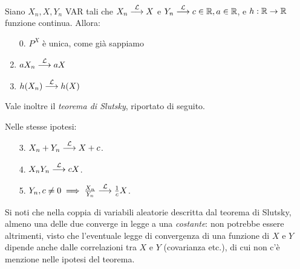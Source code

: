 \begin{prop}
  Siano $X_n, X, Y_n$ VAR tali che $X_n \stackrel{\mathcal L}{\longrightarrow} X$ e $Y_n \stackrel{\mathcal L}{\longrightarrow} c \in \mathbb R, a \in \mathbb R$, e $h:\mathbb R \to \mathbb R$ funzione continua.
  Allora:
  \begin{enumerate}
    \item[0.] $P^X$ è unica, come già sappiamo
    \item $a X_n \stackrel{\mathcal L}{\longrightarrow} aX$
    \item $h(X_n) \stackrel{\mathcal L}{\longrightarrow} h(X)$
  \end{enumerate}
  Vale inoltre il \emph{teorema di Slutsky}, riportato di seguito.
\end{prop}

\bigskip

\begin{teo}\label{collegeslutsky}
  Nelle stesse ipotesi:
  \begin{enumerate}
    \item[3.] $X_n + Y_n \stackrel{\mathcal L}{\longrightarrow} X + c$.
    \item[4.] $X_n Y_n \stackrel{\mathcal L}{\longrightarrow} cX$.
    \item[5.] $Y_n, c \neq 0 \implies \frac{X_n}{Y_n} \stackrel{\mathcal L}{\longrightarrow} \frac 1 c X$.
  \end{enumerate}
\end{teo}
Si noti che nella coppia di variabili aleatorie descritta dal teorema di Slutsky, almeno una delle due converge in legge a una \emph{costante}: non potrebbe essere altrimenti, visto che l'eventuale legge di convergenza di una funzione di $X$ e $Y$ dipende anche dalle correlazioni tra $X$ e $Y$ (covarianza etc.), di cui non c'è menzione nelle ipotesi del teorema.

